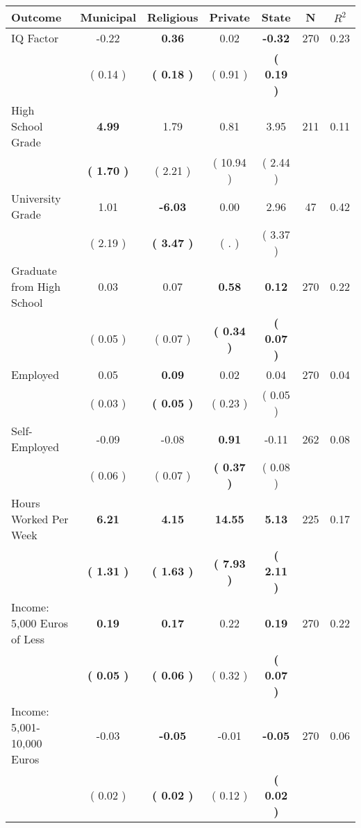 \begin{tabular}{lcccccc}
\toprule
 \textbf{Outcome} & \textbf{Municipal} & \textbf{Religious} & \textbf{Private} & \textbf{State} & \textbf{N} & \textbf{$ R^2$} \\
\midrule
IQ Factor &     -0.22 & \textbf{     0.36} &      0.02 & \textbf{    -0.32} & 270 &      0.23 \\ 
 & (     0.14 ) & \textbf{(     0.18 )} & (     0.91 ) & \textbf{(     0.19 )} & \\
High School Grade & \textbf{     4.99} &      1.79 &      0.81 &      3.95 & 211 &      0.11 \\ 
 & \textbf{(     1.70 )} & (     2.21 ) & (    10.94 ) & (     2.44 ) & \\
University Grade &      1.01 & \textbf{    -6.03} &      0.00 &      2.96 & 47 &      0.42 \\ 
 & (     2.19 ) & \textbf{(     3.47 )} & (        . ) & (     3.37 ) & \\
Graduate from High School &      0.03 &      0.07 & \textbf{     0.58} & \textbf{     0.12} & 270 &      0.22 \\ 
 & (     0.05 ) & (     0.07 ) & \textbf{(     0.34 )} & \textbf{(     0.07 )} & \\
Employed &      0.05 & \textbf{     0.09} &      0.02 &      0.04 & 270 &      0.04 \\ 
 & (     0.03 ) & \textbf{(     0.05 )} & (     0.23 ) & (     0.05 ) & \\
Self-Employed &     -0.09 &     -0.08 & \textbf{     0.91} &     -0.11 & 262 &      0.08 \\ 
 & (     0.06 ) & (     0.07 ) & \textbf{(     0.37 )} & (     0.08 ) & \\
Hours Worked Per Week & \textbf{     6.21} & \textbf{     4.15} & \textbf{    14.55} & \textbf{     5.13} & 225 &      0.17 \\ 
 & \textbf{(     1.31 )} & \textbf{(     1.63 )} & \textbf{(     7.93 )} & \textbf{(     2.11 )} & \\
Income: 5,000 Euros of Less & \textbf{     0.19} & \textbf{     0.17} &      0.22 & \textbf{     0.19} & 270 &      0.22 \\ 
 & \textbf{(     0.05 )} & \textbf{(     0.06 )} & (     0.32 ) & \textbf{(     0.07 )} & \\
Income: 5,001-10,000 Euros &     -0.03 & \textbf{    -0.05} &     -0.01 & \textbf{    -0.05} & 270 &      0.06 \\ 
 & (     0.02 ) & \textbf{(     0.02 )} & (     0.12 ) & \textbf{(     0.02 )} & \\

\end{tabular}
